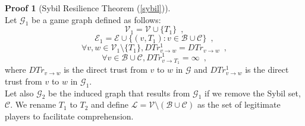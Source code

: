 \documentclass[11pt]{llncs}
\theoremstyle{definition}
\newtheorem{sepproof}{Proof}
\begin{document}
    \begin{sepproof}[Sybil Resilience Theorem (\ref{sybil})] \ \\
    \label{sybilproof}
       Let $\mathcal{G}_1$ be a game graph defined as follows:
       \begin{equation*}
          \mathcal{V}_1 = \mathcal{V} \cup \{T_1\} \enspace,
       \end{equation*}
       \begin{equation*}
          \mathcal{E}_1 = \mathcal{E} \cup \{(v, T_1) : v \in \mathcal{B} \cup \mathcal{C}\} \enspace,
       \end{equation*}
       \begin{equation*}
          \forall v,w \in \mathcal{V}_1 \setminus \{T_1\}, DTr^1_{v \rightarrow w} = DTr_{v \rightarrow w} \enspace,
       \end{equation*}
       \begin{equation*}
          \forall v \in \mathcal{B} \cup \mathcal{C}, DTr^1_{v \rightarrow T_1} = \infty \enspace,
       \end{equation*}
       where $DTr_{v \rightarrow w}$ is the direct trust from $v$ to $w$ in $\mathcal{G}$ and $DTr^1_{v \rightarrow w}$ is
       the direct trust from $v$ to $w$ in $\mathcal{G}_1$. \\
       Let also $\mathcal{G}_2$ be the induced graph that results from $\mathcal{G}_1$ if we remove the Sybil set,
       $\mathcal{C}$. We rename $T_1$ to $T_2$ and define $\mathcal{L} = \mathcal{V} \setminus \left(\mathcal{B} \cup
       \mathcal{C}\right)$ as the set of legitimate players to facilitate comprehension.
       \begin{center}
\end{center}
\end{sepproof}
\end{document}
